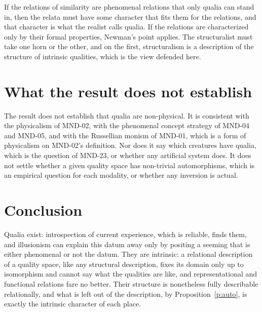 \documentclass{situationist-preprint}
\begin{document}
\begin{reply}
If the relations of similarity are phenomenal relations that only qualia can stand in, then the relata must have some character that fits them for the relations, and that character is what the realist calls qualia. If the relations are characterized only by their formal properties, Newman's point applies. The structuralist must take one horn or the other, and on the first, structuralism is a description of the structure of intrinsic qualities, which is the view defended here.
\end{reply}

\section{What the result does not establish}

The result does not establish that qualia are non-physical. It is consistent with the physicalism of MND-02, with the phenomenal concept strategy of MND-04 and MND-05, and with the Russellian monism of MND-01, which is a form of physicalism on MND-02's definition. Nor does it say which creatures have qualia, which is the question of MND-23, or whether any artificial system does. It does not settle whether a given quality space has non-trivial automorphisms, which is an empirical question for each modality, or whether any inversion is actual.

\section{Conclusion}

Qualia exist: introspection of current experience, which is reliable, finds them, and illusionism can explain this datum away only by positing a seeming that is either phenomenal or not the datum. They are intrinsic: a relational description of a quality space, like any structural description, fixes its domain only up to isomorphism and cannot say what the qualities are like, and representational and functional relations fare no better. Their structure is nonetheless fully describable relationally, and what is left out of the description, by Proposition~\ref{p:auto}, is exactly the intrinsic character of each place.
\end{document}
